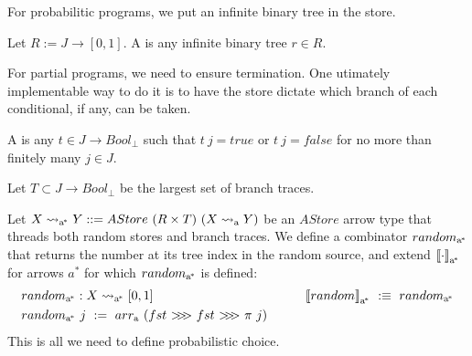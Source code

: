 \documentclass{llncs}
\newcommand{\arrow}{\rightsquigarrow}
\newcommand{\arrowarr}{\ensuremath{arr}}
\newcommand{\arrowcomp}{\ensuremath{{>}\mspace{-6mu}{>}\mspace{-6mu}{>}}}
\newcommand{\gen}{_\mathrm{a}}
\newcommand{\genc}{_\mathrm{a^{\mspace{-2mu}*}}}
\begin{document}
For probabilitic programs, we put an infinite binary tree in the store.

\begin{definition}
Let $R := J \to [0,1]$.
A  is any infinite binary tree $r \in R$.
\end{definition}

For partial programs, we need to ensure termination.
One utimately implementable way to do it is to have the store dictate which branch of each conditional, if any, can be taken.

\begin{definition}
A  is any $t \in J \to Bool_\bot$ such that $t~j = true$ or $t~j = false$ for no more than finitely many $j \in J$.

Let $T \subset J \to Bool_\bot$ be the largest set of branch traces.
\end{definition}

Let $X \arrow\genc Y ::= AStore~(R \times T)~(X \arrow\gen Y)$ be an $AStore$ arrow type that threads both random stores and branch traces.
We define a combinator $random\genc$ that returns the number at its tree index in the random source, and extend $\meaningof{\cdot}\genc$ for arrows $a^*$ for which $random\genc$ is defined:
\begin{equation}
\begin{aligned}
	&\begin{aligned}[t]
		&random\genc : X \arrow\genc [0,1] \\
		&random\genc~j \ := \ \arrowarr\gen~(fst~\arrowcomp~fst~\arrowcomp~\pi~j)
	\end{aligned}
&\tab\tab
	\meaningof{random}\genc \ :\equiv \ random\genc
\end{aligned}
\end{equation}
This is all we need to define probabilistic choice.
\end{document}
